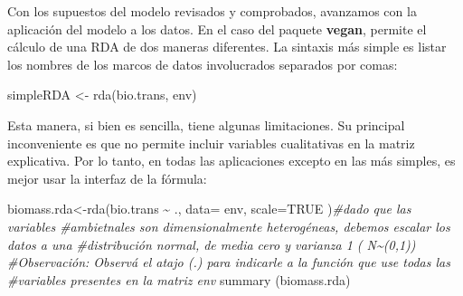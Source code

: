 \documentclass[
]{book}
\newenvironment{Shaded}{\begin{snugshade}}{\end{snugshade}}
\newcommand{\AttributeTok}[1]{\textcolor[rgb]{0.77,0.63,0.00}{#1}}
\newcommand{\CommentTok}[1]{\textcolor[rgb]{0.56,0.35,0.01}{\textit{#1}}}
\newcommand{\ConstantTok}[1]{\textcolor[rgb]{0.00,0.00,0.00}{#1}}
\newcommand{\FunctionTok}[1]{\textcolor[rgb]{0.00,0.00,0.00}{#1}}
\newcommand{\NormalTok}[1]{#1}
\newcommand{\OtherTok}[1]{\textcolor[rgb]{0.56,0.35,0.01}{#1}}
\newcommand{\SpecialCharTok}[1]{\textcolor[rgb]{0.00,0.00,0.00}{#1}}
\begin{document}
Con los supuestos del modelo revisados y comprobados, avanzamos con la aplicación del modelo a los datos. En el caso del paquete \textbf{vegan}, permite el cálculo de una RDA de dos maneras diferentes. La sintaxis más simple es listar los nombres de los marcos de datos involucrados separados por comas:

\begin{Shaded}
\begin{Highlighting}[]
\NormalTok{simpleRDA }\OtherTok{\textless{}{-}} \FunctionTok{rda}\NormalTok{(bio.trans, env)}
\end{Highlighting}
\end{Shaded}

Esta manera, si bien es sencilla, tiene algunas limitaciones. Su principal inconveniente es que no permite incluir variables cualitativas en la matriz explicativa. Por lo tanto, en todas las aplicaciones excepto en las más simples, es mejor usar la interfaz de la fórmula:

\begin{Shaded}
\begin{Highlighting}[]
\NormalTok{biomass.rda}\OtherTok{\textless{}{-}}\FunctionTok{rda}\NormalTok{(bio.trans }\SpecialCharTok{\textasciitilde{}}\NormalTok{ ., }\AttributeTok{data=}\NormalTok{ env, }\AttributeTok{scale=}\ConstantTok{TRUE}\NormalTok{ )}\CommentTok{\#dado que las variables \#ambietnales son dimensionalmente heterogéneas, debemos escalar los datos a una \#distribución normal, de media cero y varianza 1 ( N\textasciitilde{}(0,1))}
\CommentTok{\#Observación: Observá el atajo (.) para indicarle a la función que use todas las \#variables presentes en la matriz env}
\FunctionTok{summary}\NormalTok{ (biomass.rda)}
\end{Highlighting}
\end{Shaded}
\end{document}
